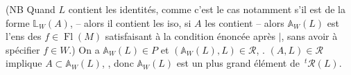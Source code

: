(NB Quand $L$ contient les identités, comme c'est
le cas notamment s'il est de la forme $\mathbb L_W(A)$,
-- alors il contient les iso,  si $A$ les
contient -- alors $\mathbb A_W(L)$ est l'ens des $f\in\operatorname{Fl}(M)$
satisfaisant à la condition énoncée après $\mid$, sans
avoir à spécifier $f\in W$.) On a $\mathbb A_W(L)\in P$
 et  $(\mathbb A_W(L),L)\in\mathcal R$,
.
 $(A,L)\in\mathcal R$ implique $A\subset\mathbb A_W(L)$, 
,
donc $\mathbb A_W(L)$ est un plus grand élément de
$\,{}^{t}\mathcal R(L)$.
